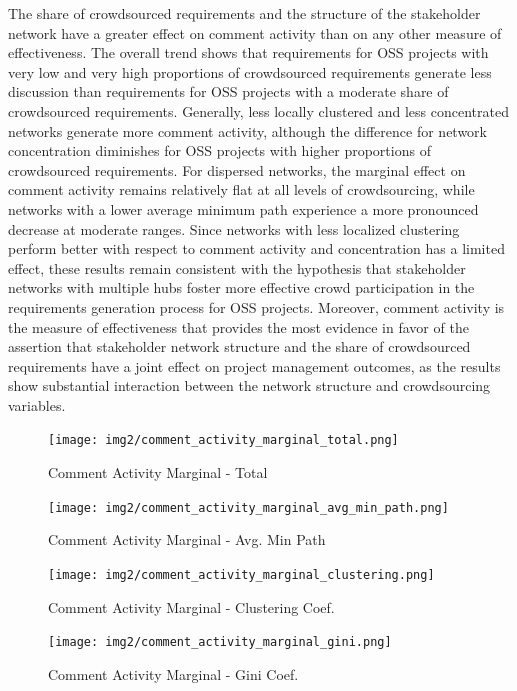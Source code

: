 The share of crowdsourced requirements and the structure of the stakeholder network have a greater effect on comment activity than on any other measure of effectiveness. The overall trend shows that requirements for OSS projects with very low and very high proportions of crowdsourced requirements generate less discussion than requirements for OSS projects with a moderate share of crowdsourced requirements. Generally, less locally clustered and less concentrated networks generate more comment activity, although the difference for network concentration diminishes for OSS projects with higher proportions of crowdsourced requirements. For dispersed networks, the marginal effect on comment activity remains relatively flat at all levels of crowdsourcing, while networks with a lower average minimum path experience a more pronounced decrease at moderate ranges. Since networks with less localized clustering perform better with respect to comment activity and concentration has a limited effect, these results remain consistent with the hypothesis that stakeholder networks with multiple hubs foster more effective crowd participation in the requirements generation process for OSS projects. Moreover, comment activity is the measure of effectiveness that provides the most evidence in favor of the assertion that stakeholder network structure and the share of crowdsourced requirements have a joint effect on project management outcomes, as the results show substantial interaction between the network structure and crowdsourcing variables.

\begin{figure}
  \texttt{[image: img2/comment\_activity\_marginal\_total.png]}
\caption{Comment Activity Marginal - Total}
\label{comment_activity_marginal_total}
\end{figure}

\begin{figure}
  \texttt{[image: img2/comment\_activity\_marginal\_avg\_min\_path.png]}
\caption{Comment Activity Marginal - Avg. Min Path}
\label{comment_activity_marginal_avg_min_path}
\end{figure}

\begin{figure}
  \texttt{[image: img2/comment\_activity\_marginal\_clustering.png]}
\caption{Comment Activity Marginal - Clustering Coef.}
\label{comment_activity_marginal_clustering}
\end{figure}

\begin{figure}
  \texttt{[image: img2/comment\_activity\_marginal\_gini.png]}
\caption{Comment Activity Marginal - Gini Coef.}
\label{comment_activity_marginal_gini}
\end{figure}


